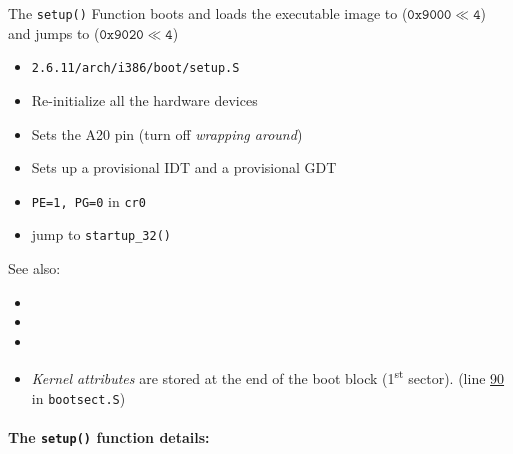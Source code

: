 \begin{frame}{The \texttt{setup()} Function}
  boots and loads the executable image to ($\mathtt{0x9000\ll 4}$) and jumps to
  ($\mathtt{0x9020\ll 4}$)
  \begin{center}
  \end{center}
  \begin{itemize}
  \item \texttt{2.6.11/arch/i386/boot/setup.S}
  \item Re-initialize all the hardware devices
  \item Sets the A20 pin (turn off \emph{wrapping around})
  \item Sets up a provisional IDT and a provisional GDT
  \item \texttt{PE=1, PG=0} in \texttt{cr0}
  \item jump to \texttt{startup\_32()}
  \end{itemize}
\end{frame}

See also:
\begin{itemize}
\item {}
\item {}
\item {}
\end{itemize}

\begin{itemize}
\item \emph{Kernel attributes} are stored at the end of the boot block
  (1\textsuperscript{st} sector).
  (line \href{http://lxr.linux.no/linux+v2.6.11/arch/i386/boot/bootsect.S\#L90}{90} in
    \texttt{bootsect.S})
\end{itemize}  

\paragraph{The \texttt{setup()} function details:}

